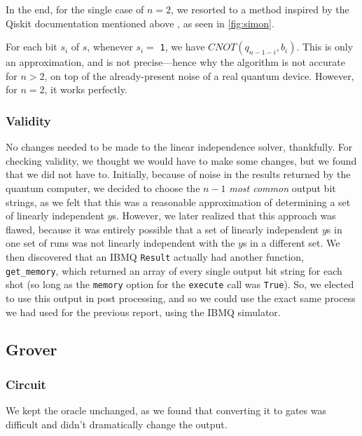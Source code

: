 \documentclass[12pt]{article}
\begin{document}
In the end, for the single case of $n = 2$, we resorted to a method inspired by the Qiskit documentation mentioned above \cite{qiskitsimon}, as seen in \autoref{fig:simon}.


    For each bit $s_i$ of $s$, whenever $s_i = $ \texttt{1}, we have $CNOT(q_{n-1-i}, b_i)$.
    This is only an approximation, and is not precise---hence why the algorithm is not accurate for $n > 2$, on top of the already-present noise of a real quantum device.
    However, for $n=2$, it works perfectly.

\subsubsection*{Validity}

No changes needed to be made to the linear independence solver, thankfully.
For checking validity, we thought we would have to make some changes, but we found that we did not have to.
Initially, because of noise in the results returned by the quantum computer, we decided to choose the $n-1$ \textit{most common} output bit strings, as we felt that this was a reasonable approximation of determining a set of linearly independent $y$s.
However, we later realized that this approach was flawed, because it was entirely possible that a set of linearly independent $y$s in one set of runs was not linearly independent with the $y$s in a different set.
We then discovered that an IBMQ \texttt{Result} actually had another function, \texttt{get\_memory}, which returned an array of every single output bit string for each shot (so long as the \texttt{memory} option for the \texttt{execute} call was \texttt{True}).
So, we elected to use this output in post processing, and so we could use the exact same process we had used for the previous report, using the IBMQ simulator.

\subsection{Grover}

\subsubsection*{Circuit}
We kept the oracle unchanged, as we found that converting it to gates was difficult and didn’t dramatically change the output.
\end{document}
